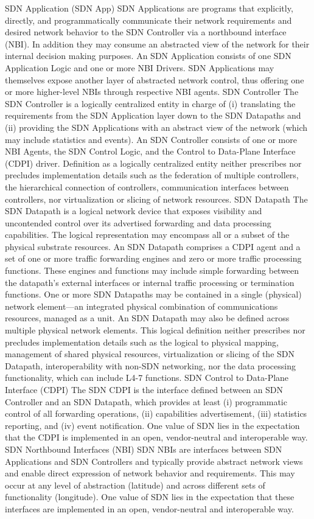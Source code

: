 SDN Application (SDN App)
SDN Applications are programs that explicitly, directly, and programmatically communicate their network requirements and desired network behavior to the SDN Controller via a northbound interface (NBI). In addition they may consume an abstracted view of the network for their internal decision making purposes. An SDN Application consists of one SDN Application Logic and one or more NBI Drivers. SDN Applications may themselves expose another layer of abstracted network control, thus offering one or more higher-level NBIs through respective NBI agents.
SDN Controller
The SDN Controller is a logically centralized entity in charge of (i) translating the requirements from the SDN Application layer down to the SDN Datapaths and (ii) providing the SDN Applications with an abstract view of the network (which may include statistics and events). An SDN Controller consists of one or more NBI Agents, the SDN Control Logic, and the Control to Data-Plane Interface (CDPI) driver. Definition as a logically centralized entity neither prescribes nor precludes implementation details such as the federation of multiple controllers, the hierarchical connection of controllers, communication interfaces between controllers, nor virtualization or slicing of network resources.
SDN Datapath
The SDN Datapath is a logical network device that exposes visibility and uncontended control over its advertised forwarding and data processing capabilities. The logical representation may encompass all or a subset of the physical substrate resources. An SDN Datapath comprises a CDPI agent and a set of one or more traffic forwarding engines and zero or more traffic processing functions. These engines and functions may include simple forwarding between the datapath's external interfaces or internal traffic processing or termination functions. One or more SDN Datapaths may be contained in a single (physical) network element—an integrated physical combination of communications resources, managed as a unit. An SDN Datapath may also be defined across multiple physical network elements. This logical definition neither prescribes nor precludes implementation details such as the logical to physical mapping, management of shared physical resources, virtualization or slicing of the SDN Datapath, interoperability with non-SDN networking, nor the data processing functionality, which can include L4-7 functions.
SDN Control to Data-Plane Interface (CDPI)
The SDN CDPI is the interface defined between an SDN Controller and an SDN Datapath, which provides at least (i) programmatic control of all forwarding operations, (ii) capabilities advertisement, (iii) statistics reporting, and (iv) event notification. One value of SDN lies in the expectation that the CDPI is implemented in an open, vendor-neutral and interoperable way.
SDN Northbound Interfaces (NBI)
SDN NBIs are interfaces between SDN Applications and SDN Controllers and typically provide abstract network views and enable direct expression of network behavior and requirements. This may occur at any level of abstraction (latitude) and across different sets of functionality (longitude). One value of SDN lies in the expectation that these interfaces are implemented in an open, vendor-neutral and interoperable way.


